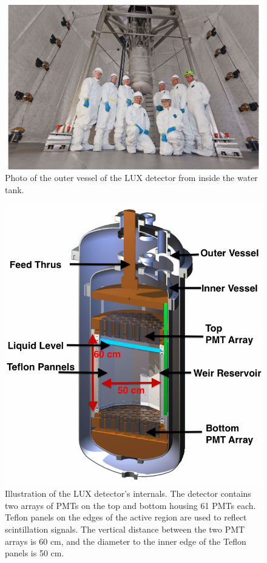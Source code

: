  \begin{figure}[h!]\centering
\includegraphics[scale=0.5]{Chapter_LUX_Det/LUX_Real.png}
\caption{Photo of the outer vessel of the LUX detector from inside the water tank.}
\label{fig:LUX_Real}
\end{figure}


 \begin{figure}[h!]\centering
\includegraphics[scale=0.5]{Chapter_LUX_Det/LUX_half_rendering_white_text.png}
\caption{Illustration of the LUX detector's internals. The detector contains two arrays of PMTs on the top and bottom housing 61 PMTs each. Teflon panels on the edges of the active region are used to reflect scintillation signals. The vertical distance between the two PMT arrays is 60 cm, and the diameter to the inner edge of the Teflon panels is 50 cm. }
\label{fig:LUX_TPC}
\end{figure}

